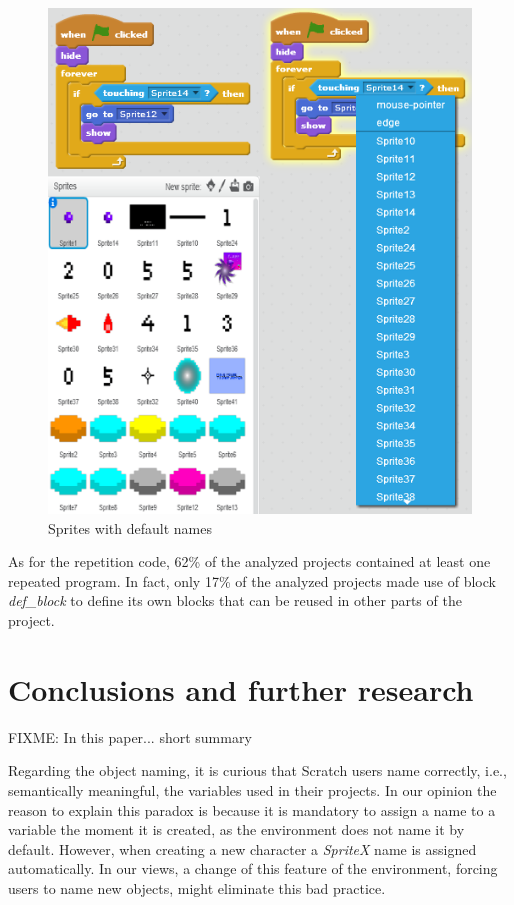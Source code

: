 \documentclass[conference]{format/IEEEtran}
\begin{document}
\begin{figure}
  \centering
    \includegraphics{img/SpriteNaming.png}
  \caption{Sprites with default names}
  \label{fig:SpriteNaming}
\end{figure}

As for the repetition code, 62\% of the analyzed projects contained at least one repeated program. In fact, only 17\% of the analyzed projects made use of block \textit{def\_block} to define its own blocks that can be reused in other parts of the project. 

\section{Conclusions and further research}
\label{sec:conclusions}

FIXME: In this paper... short summary

Regarding the object naming, it is curious that Scratch users name correctly, i.e., semantically meaningful, the variables used in their projects. In our opinion the reason to explain this paradox is because it is mandatory to assign a name to a variable the moment it is created, as the environment does not name it by default. However, when creating a new character a  \textit{SpriteX} name is assigned automatically. In our views, a change of this feature of the environment, forcing users to name new objects, might eliminate this bad practice.
\end{document}
